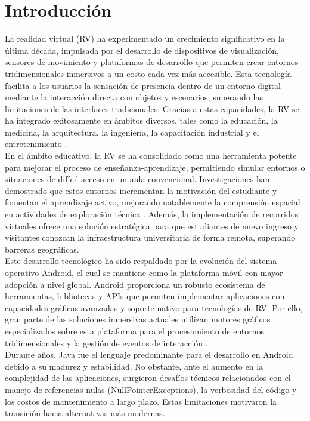 \documentclass[conference]{IEEEtran}
\begin{document}
\section{Introducción}

La realidad virtual (RV) ha experimentado un crecimiento significativo en la última década, impulsada por el desarrollo de dispositivos de visualización, sensores de movimiento y plataformas de desarrollo que permiten crear entornos tridimensionales inmersivos a un costo cada vez más accesible. Esta tecnología facilita a los usuarios la sensación de presencia dentro de un entorno digital mediante la interacción directa con objetos y escenarios, superando las limitaciones de las interfaces tradicionales. Gracias a estas capacidades, la RV se ha integrado exitosamente en ámbitos diversos, tales como la educación, la medicina, la arquitectura, la ingeniería, la capacitación industrial y el entretenimiento \cite{radianti2020, merchant2014}.\\

En el ámbito educativo, la RV se ha consolidado como una herramienta potente para mejorar el proceso de enseñanza-aprendizaje, permitiendo simular entornos o situaciones de difícil acceso en un aula convencional. Investigaciones han demostrado que estos entornos incrementan la motivación del estudiante y fomentan el aprendizaje activo, mejorando notablemente la comprensión espacial en actividades de exploración técnica \cite{radianti2020, freina2015}. Además, la implementación de recorridos virtuales ofrece una solución estratégica para que estudiantes de nuevo ingreso y visitantes conozcan la infraestructura universitaria de forma remota, superando barreras geográficas.\\

Este desarrollo tecnológico ha sido respaldado por la evolución del sistema operativo Android, el cual se mantiene como la plataforma móvil con mayor adopción a nivel global. Android proporciona un robusto ecosistema de herramientas, bibliotecas y APIs que permiten implementar aplicaciones con capacidades gráficas avanzadas y soporte nativo para tecnologías de RV. Por ello, gran parte de las soluciones inmersivas actuales utilizan motores gráficos especializados sobre esta plataforma para el procesamiento de entornos tridimensionales y la gestión de eventos de interacción \cite{androiddevelopers, arcore}.\\

Durante años, Java fue el lenguaje predominante para el desarrollo en Android debido a su madurez y estabilidad. No obstante, ante el aumento en la complejidad de las aplicaciones, surgieron desafíos técnicos relacionados con el manejo de referencias nulas (NullPointerExceptions), la verbosidad del código y los costos de mantenimiento a largo plazo. Estas limitaciones motivaron la transición hacia alternativas más modernas.\\
\end{document}
